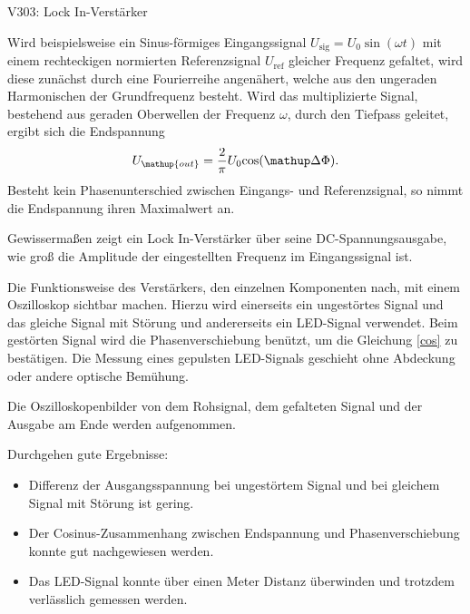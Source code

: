 \begin{Versuch}{V303: Lock In-Verstärker}
\begin{Theorie}
    	Wird beispielsweise ein Sinus-förmiges Eingangssignal $U_\mathup{sig}=U_0 \sin(\omega t)$ mit einem rechteckigen normierten Referenzsignal $U_\mathup{ref}$ gleicher Frequenz gefaltet, wird diese zunächst durch eine Fourierreihe angenähert, welche aus den ungeraden Harmonischen der Grundfrequenz besteht. 
		Wird das multiplizierte Signal,  bestehend aus geraden Oberwellen der Frequenz $\omega$, durch den Tiefpass geleitet, ergibt sich die Endspannung
		\begin{equation}
			U_\mathup{out}=\frac{2}{\pi}U_0\text{cos}(\upD\Phi).
			\label{cos}
		\end{equation}
		Besteht kein Phasenunterschied zwischen Eingangs- und Referenzsignal, so nimmt die Endspannung ihren Maximalwert an.

		Gewissermaßen zeigt ein Lock In-Verstärker über seine DC-Spannungsausgabe, wie groß die Amplitude der eingestellten Frequenz im Eingangssignal ist.

	\end{Theorie}
    
    \begin{Durchführung}
    	Die Funktionsweise des Verstärkers, den einzelnen Komponenten nach, mit einem Oszilloskop sichtbar machen.
    	Hierzu wird einerseits ein ungestörtes Signal und das gleiche Signal mit Störung und andererseits ein LED-Signal verwendet.
    	Beim gestörten Signal wird die Phasenverschiebung benützt, um die Gleichung \eqref{cos} zu bestätigen. Die Messung eines gepulsten LED-Signals geschieht ohne Abdeckung oder andere optische Bemühung.

    	Die Oszilloskopenbilder von dem Rohsignal, dem gefalteten Signal und der Ausgabe am Ende werden aufgenommen.
    \end{Durchführung}        
    
    \begin{Auswertung}
    	Durchgehen gute Ergebnisse:
    	\begin{itemize}
    		\item Differenz der Ausgangsspannung bei ungestörtem Signal und bei gleichem Signal mit Störung ist gering.
    		\item Der Cosinus-Zusammenhang zwischen Endspannung und Phasenverschiebung konnte gut nachgewiesen werden.
    		\item Das LED-Signal konnte über einen Meter Distanz überwinden und trotzdem verlässlich gemessen werden.
    	\end{itemize}
    \end{Auswertung}


\end{Versuch}
